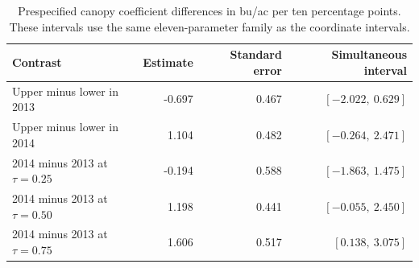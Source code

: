 \begin{table}[t]
\centering
\small
\caption{Prespecified canopy coefficient differences in bu/ac per ten percentage points. These intervals use the same eleven-parameter family as the coordinate intervals.}
\label{tab:soy-contrasts}
\begin{tabular}{lrrr}
\toprule
Contrast & Estimate & Standard error & Simultaneous interval \\
\midrule
Upper minus lower in 2013 & -0.697 & 0.467 & $[-2.022,\ 0.629]$ \\
Upper minus lower in 2014 & 1.104 & 0.482 & $[-0.264,\ 2.471]$ \\
2014 minus 2013 at $\tau=0.25$ & -0.194 & 0.588 & $[-1.863,\ 1.475]$ \\
2014 minus 2013 at $\tau=0.50$ & 1.198 & 0.441 & $[-0.055,\ 2.450]$ \\
2014 minus 2013 at $\tau=0.75$ & 1.606 & 0.517 & $[0.138,\ 3.075]$ \\
\bottomrule
\end{tabular}
\end{table}
